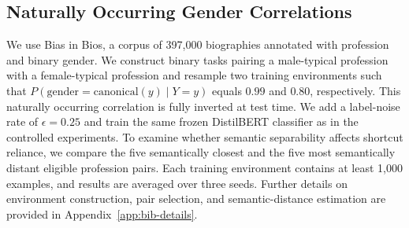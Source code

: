 \documentclass[11pt]{article}
\theoremstyle{definition}
\theoremstyle{plain}
\newcommand{\ms}[2]{%
    \ensuremath{#1 \pm #2}%
}
\renewcommand{\ms}[2]{%
  \ensuremath{#1{\scriptstyle\,\pm\,#2}}%
}
\begin{document}
\subsection{Naturally Occurring Gender Correlations}
\label{sec:bias-in-bios}

We use Bias in Bios, a corpus of 397,000 biographies annotated with profession and binary gender. We construct binary tasks pairing a male-typical profession with a female-typical profession and resample two training environments such that $P(\text{gender}=\text{canonical}(y)\mid Y=y)$ equals $0.99$ and $0.80$, respectively. This naturally occurring correlation is fully inverted at test time. We add a label-noise rate of $\epsilon=0.25$ and train the same frozen DistilBERT classifier as in the controlled experiments. To examine whether semantic separability affects shortcut reliance, we compare the five semantically closest and the five most semantically distant eligible profession pairs. Each training environment contains at least 1,000 examples, and results are averaged over three seeds. Further details on environment construction, pair selection, and semantic-distance estimation are provided in Appendix~\ref{app:bib-details}.

\renewcommand{\ms}[2]{%
  \ensuremath{#1{\scriptstyle\,\pm\,#2}}%
}
\end{document}
